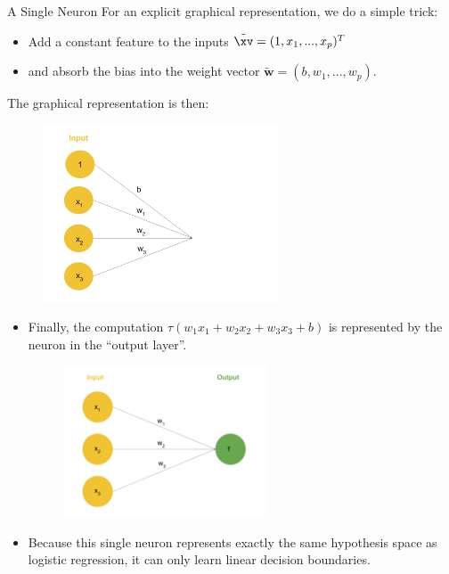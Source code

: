 \begin{vbframe} {A Single Neuron}
For an explicit graphical representation, we do a simple trick: 
\begin{itemize}
\item Add a constant feature to the inputs $\tilde{\xv} = (1, x_1, ..., x_p)^T$
\item and absorb the bias into the weight vector $\tilde{\bm{w}} = (b, w_1, ..., w_p)$.
\end{itemize}
The graphical representation is then: 
\begin{figure}
\includegraphics[width=7cm]{figure/neurep_bias.png}
\end{figure}
\framebreak

\begin{itemize}
\item Finally, the computation $\tau(w_1x_1 + w_2x_2 + w_3x_3 + b)$ is represented by the neuron in the \enquote{output layer}.
\begin{figure}
\includegraphics[width=6cm]{figure/neurep_three.png}
\end{figure}
\item Because this single neuron represents exactly the same hypothesis space as logistic regression, it can only learn linear decision boundaries.
\framebreak


\end{itemize}
\end{vbframe}
